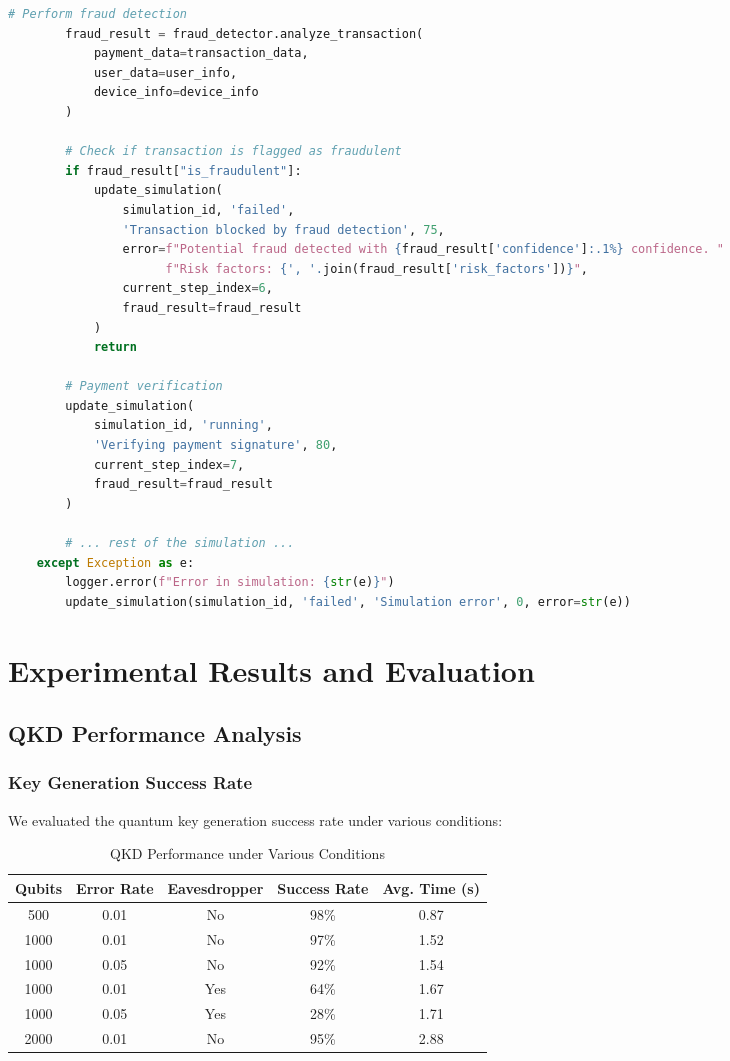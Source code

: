 \documentclass[conference]{IEEEtran}
\begin{document}
\begin{lstlisting}[language=Python, caption=Updated Simulation with Fraud Detection]
        # Perform fraud detection
        fraud_result = fraud_detector.analyze_transaction(
            payment_data=transaction_data,
            user_data=user_info,
            device_info=device_info
        )
        
        # Check if transaction is flagged as fraudulent
        if fraud_result["is_fraudulent"]:
            update_simulation(
                simulation_id, 'failed', 
                'Transaction blocked by fraud detection', 75,
                error=f"Potential fraud detected with {fraud_result['confidence']:.1%} confidence. "
                      f"Risk factors: {', '.join(fraud_result['risk_factors'])}",
                current_step_index=6,
                fraud_result=fraud_result
            )
            return
            
        # Payment verification
        update_simulation(
            simulation_id, 'running', 
            'Verifying payment signature', 80,
            current_step_index=7,
            fraud_result=fraud_result
        )
        
        # ... rest of the simulation ...
    except Exception as e:
        logger.error(f"Error in simulation: {str(e)}")
        update_simulation(simulation_id, 'failed', 'Simulation error', 0, error=str(e))
\end{lstlisting}

\section{Experimental Results and Evaluation}

\subsection{QKD Performance Analysis}

\subsubsection{Key Generation Success Rate}
We evaluated the quantum key generation success rate under various conditions:

\begin{table}[h]
\centering
\begin{tabular}{|c|c|c|c|c|}
\hline
\textbf{Qubits} & \textbf{Error Rate} & \textbf{Eavesdropper} & \textbf{Success Rate} & \textbf{Avg. Time (s)} \\
\hline
500 & 0.01 & No & 98\% & 0.87 \\
\hline
1000 & 0.01 & No & 97\% & 1.52 \\
\hline
1000 & 0.05 & No & 92\% & 1.54 \\
\hline
1000 & 0.01 & Yes & 64\% & 1.67 \\
\hline
1000 & 0.05 & Yes & 28\% & 1.71 \\
\hline
2000 & 0.01 & No & 95\% & 2.88 \\
\hline
\end{tabular}
\caption{QKD Performance under Various Conditions}
\label{tab:qkd_performance}
\end{table}
\end{document}
